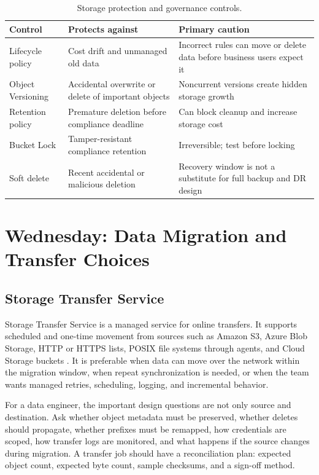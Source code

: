 \begin{table}[H]
\centering
\small
\begin{tabular}{@{}p{3.0cm}p{4.7cm}p{5.0cm}@{}}
\toprule
\textbf{Control} & \textbf{Protects against} & \textbf{Primary caution} \\
\midrule
Lifecycle policy & Cost drift and unmanaged old data & Incorrect rules can move or delete data before business users expect it \\
Object Versioning & Accidental overwrite or delete of important objects & Noncurrent versions create hidden storage growth \\
Retention policy & Premature deletion before compliance deadline & Can block cleanup and increase storage cost \\
Bucket Lock & Tamper-resistant compliance retention & Irreversible; test before locking \\
Soft delete & Recent accidental or malicious deletion & Recovery window is not a substitute for full backup and DR design \\
\bottomrule
\end{tabular}
\caption{Storage protection and governance controls.}
\label{tab:protection-controls}
\end{table}

\section{Wednesday: Data Migration and Transfer Choices}

\subsection{Storage Transfer Service}
Storage Transfer Service is a managed service for online transfers. It supports scheduled and one-time movement from sources such as Amazon S3, Azure Blob Storage, HTTP or HTTPS lists, POSIX file systems through agents, and Cloud Storage buckets \cite{googlecloudstoragetransfer}. It is preferable when data can move over the network within the migration window, when repeat synchronization is needed, or when the team wants managed retries, scheduling, logging, and incremental behavior.

For a data engineer, the important design questions are not only source and destination. Ask whether object metadata must be preserved, whether deletes should propagate, whether prefixes must be remapped, how credentials are scoped, how transfer logs are monitored, and what happens if the source changes during migration. A transfer job should have a reconciliation plan: expected object count, expected byte count, sample checksums, and a sign-off method.


